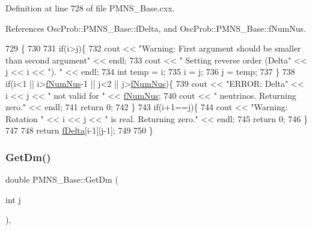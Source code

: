 Definition at line 728 of file P\+M\+N\+S\+\_\+\+Base.\+cxx.



References Osc\+Prob\+::\+P\+M\+N\+S\+\_\+\+Base\+::f\+Delta, and Osc\+Prob\+::\+P\+M\+N\+S\+\_\+\+Base\+::f\+Num\+Nus.


\begin{DoxyCode}
729 \{
730 
731   \textcolor{keywordflow}{if}(i>j)\{
732     cout << \textcolor{stringliteral}{"Warning: First argument should be smaller than second argument"} << endl;
733     cout << \textcolor{stringliteral}{"         Setting reverse order (Delta"} << j << i << \textcolor{stringliteral}{"). "} << endl;
734     \textcolor{keywordtype}{int} temp = i;
735     i = j;
736     j = temp;
737   \}
738   \textcolor{keywordflow}{if}(i<1 || i>\hyperlink{classOscProb_1_1PMNS__Base_a24bb74bed63569dfe88b18fa6a08060e}{fNumNus}-1 || j<2 || j>\hyperlink{classOscProb_1_1PMNS__Base_a24bb74bed63569dfe88b18fa6a08060e}{fNumNus})\{
739     cout << \textcolor{stringliteral}{"ERROR: Delta"} << i << j << \textcolor{stringliteral}{" not valid for "} << \hyperlink{classOscProb_1_1PMNS__Base_a24bb74bed63569dfe88b18fa6a08060e}{fNumNus};
740     cout << \textcolor{stringliteral}{" neutrinos. Returning zero."} << endl;
741     \textcolor{keywordflow}{return} 0;
742   \}
743   \textcolor{keywordflow}{if}(i+1==j)\{
744     cout << \textcolor{stringliteral}{"Warning: Rotation "} << i << j << \textcolor{stringliteral}{" is real. Returning zero."} << endl;
745     \textcolor{keywordflow}{return} 0;
746   \}
747 
748   \textcolor{keywordflow}{return} \hyperlink{classOscProb_1_1PMNS__Base_ab2a5fa40e689b221c8a7d2c17213810d}{fDelta}[i-1][j-1];
749 
750 \}
\end{DoxyCode}
\mbox{\label{classOscProb_1_1PMNS__Base_ad26815ac5f4805d1259817e4936e5f8f}} 
\subsubsection{\texorpdfstring{Get\+Dm()}{GetDm()}}
{\footnotesize\ttfamily double P\+M\+N\+S\+\_\+\+Base\+::\+Get\+Dm (\begin{DoxyParamCaption}\item[{int}]{j }\end{DoxyParamCaption})\hspace{0.3cm}{\ttfamily [virtual]}, {\ttfamily [inherited]}}

